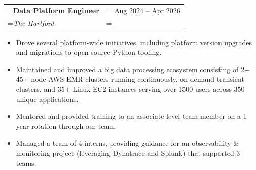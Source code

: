 \documentclass{article}
\begin{document}
\hspace{-1em}
\vspace{-.5em}

\begin{tabularx}{\textwidth}{
    >{\raggedright\arraybackslash\hsize=1\hsize\linewidth=\hsize}X
    >{\raggedleft\arraybackslash\hsize=1\hsize\linewidth=\hsize}X }
    \textbf{Data Platform Engineer} & Aug 2024 -- Apr 2026\\
    \textit{The Hartford} & \\
\end{tabularx}
\vspace{-.5em}
\begin{itemize}[label={•}, leftmargin=1em]
    \setlength\itemsep{0em}
    \item Drove several platform-wide initiatives, including platform version upgrades and migrations to open-source Python tooling.
    \item Maintained and improved a big data processing ecosystem consisting of 2+ 45+ node AWS EMR clusters running continuously, on-demand transient clusters, and 35+ Linux EC2 instances serving over 1500 users across 350 unique applications.
    \item Mentored and provided training to an associate-level team member on a 1 year rotation through our team.
    \item Managed a team of 4 interns, providing guidance for an observability \& monitoring project (leveraging Dynatrace and Splunk) that supported 3 teams.
\end{itemize}

\hspace{-1em}
\end{document}
